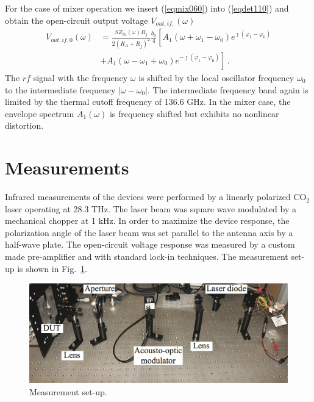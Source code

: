 \documentclass[journal]{IEEEtran}
\begin{document}
For the case of mixer operation we insert (\ref{eqmix060}) into (\ref{eqdet110}) and obtain the open-circuit output voltage $V_{out,if,}(\omega)$ 
%
\begin{align}	\label{eqmix080}
	V_{out,if,0}(\omega) &=  \frac{S  Z_{th}(\omega) R_j}{2(R_A+R_j )^2} 
	 \frac{b_0}{4}\left[ A_1(\omega + \omega_1 -\omega_0 )e^{\jmath (\varphi_1-\varphi_0)} \right. \\
	& +  \left. A_1(\omega - \omega_1 +\omega_0 )e^{-\jmath (\varphi_1-\varphi_0)} \right] 
	\, . \nonumber
\end{align}
%
The $rf$ signal with the frequency $\omega$ is shifted by the local oscillator frequency $\omega_0$ to the intermediate frequency $|\omega-\omega_0|$. The intermediate frequency band again is limited by the thermal cutoff frequency of 136.6 GHz. In the mixer case, the envelope spectrum $A_1(\omega)$ is frequency shifted but exhibits no nonlinear distortion.
%
%
%
\section{Measurements}\label{Measurements}
%
%
Infrared measurements of the devices were performed by a linearly polarized CO$_2$ laser operating at 28.3 THz. The laser beam was square wave modulated by a mechanical chopper at 1 kHz. In order to maximize the device response, the polarization angle of the laser beam was set parallel to the antenna axis by a half-wave plate. The open-circuit voltage response was measured by a custom made pre-amplifier and with standard lock-in techniques. The measurement set-up is shown in Fig.~\ref{figsetup}.

%
\begin{figure}[h]
\centerline{\includegraphics[width=1.0\columnwidth,clip]{figures/setup.jpg}}
\caption{Measurement set-up.}
\label{figsetup}
\end{figure}
%
\end{document}
